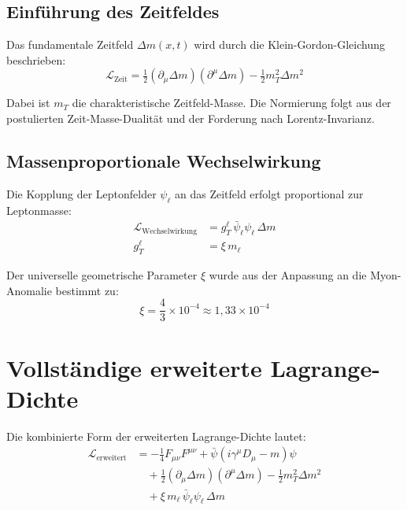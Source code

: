 \documentclass[12pt,a4paper]{article}
\theoremstyle{definition}
\begin{document}
	\subsection{Einführung des Zeitfeldes}
	
	Das fundamentale Zeitfeld $\Delta m(x,t)$ wird durch die Klein-Gordon-Gleichung beschrieben:
	\begin{equation}
		\mathcal{L}_{\text{Zeit}} = \tfrac{1}{2}(\partial_\mu \Delta m)(\partial^\mu \Delta m) - \tfrac{1}{2} m_T^2 \Delta m^2
		\label{eq:time_field_lagrangian}
	\end{equation}
	
	Dabei ist $m_T$ die charakteristische Zeitfeld-Masse. Die Normierung folgt aus der postulierten Zeit-Masse-Dualität und der Forderung nach Lorentz-Invarianz\cite{pascher_mathematical_structure_2025}.
	
	\subsection{Massenproportionale Wechselwirkung}
	
	Die Kopplung der Leptonfelder $\psi_\ell$ an das Zeitfeld erfolgt proportional zur Leptonmasse:
	\begin{align}
		\mathcal{L}_{\text{Wechselwirkung}} &= g_T^\ell \, \bar{\psi}_\ell \psi_\ell \, \Delta m \label{eq:interaction_lagrangian}\\
		g_T^\ell &= \xi \, m_\ell \label{eq:coupling_strength}
	\end{align}
	
	Der universelle geometrische Parameter $\xi$ wurde aus der Anpassung an die Myon-Anomalie bestimmt zu:
	\begin{equation}
		\xi = \frac{4}{3} \times 10^{-4} \approx 1,33 \times 10^{-4}
		\label{eq:xi_parameter}
	\end{equation}
	
	\section{Vollständige erweiterte Lagrange-Dichte}
	
	Die kombinierte Form der erweiterten Lagrange-Dichte lautet:
	\begin{align}
		\mathcal{L}_{\text{erweitert}} &= -\tfrac{1}{4} F_{\mu\nu}F^{\mu\nu} + \bar{\psi}(i\gamma^\mu D_\mu - m)\psi \nonumber\\
		&\quad + \tfrac{1}{2}(\partial_\mu \Delta m)(\partial^\mu \Delta m) - \tfrac{1}{2} m_T^2 \Delta m^2 \nonumber\\
		&\quad + \xi \, m_\ell \,\bar{\psi}_\ell \psi_\ell \, \Delta m
		\label{eq:extended_lagrangian}
	\end{align}
	
\end{document}
